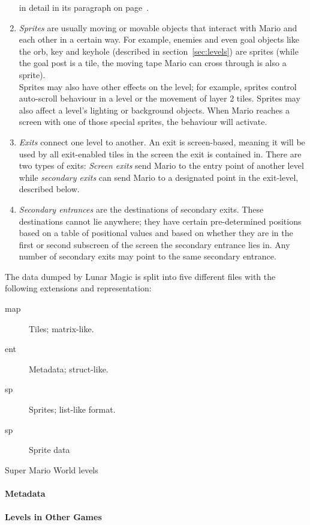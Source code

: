 \begin{enumerate}
  in detail in its paragraph on page~\pageref{par:metadata}.
\item \emph{Sprites} are usually moving or movable objects that
  interact with Mario and each other in a certain way. For example,
  enemies and even goal objects like the orb, key and keyhole
  (described in section~\ref{sec:levels}) are sprites (while the goal
  post is a tile, the moving tape Mario can cross through is also a
  sprite). \\
  Sprites may also have other effects on the level; for example,
  sprites control auto-scroll behaviour in a level or the movement of
  layer 2 tiles. Sprites may also affect a level's lighting or
  background objects. When Mario reaches a screen with one of those
  special sprites, the behaviour will activate.
\item \emph{Exits} connect one level to another. An exit is
  screen-based, meaning it will be used by all exit-enabled tiles in
  the screen the exit is contained in. There are two types of exits:
  \emph{Screen exits} send Mario to the entry point of another level
  while \emph{secondary exits} can send Mario to a designated point in
  the exit-level, described below.
\item \emph{Secondary entrances} are the destinations of secondary
  exits. These destinations cannot lie anywhere; they have certain
  pre-determined positions based on a table of positional values and
  based on whether they are in the first or second subscreen of the
  screen the secondary entrance lies in. Any number of secondary exits
  may point to the same secondary entrance.
\end{enumerate}

The data dumped by Lunar Magic is split into five different files with
the following extensions and representation:
\begin{description}
\item[map] Tiles; matrix-like.
\item[ent] Metadata; struct-like.
\item[sp] Sprites; list-like format.
\item[sp] Sprite data
\end{description}
Super Mario World levels 

\paragraph{Metadata}
\label{par:metadata}

\paragraph{Levels in Other Games}



